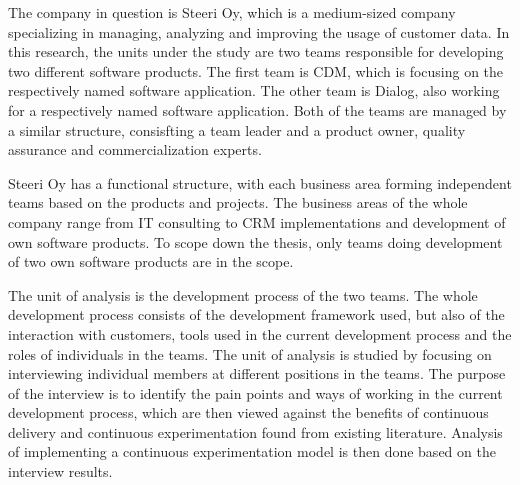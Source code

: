\documentclass[english]{tktltiki2}
\theoremstyle{definition}
\theoremstyle{remark}
\begin{document}

The company in question is Steeri Oy, which is a medium-sized company specializing in managing, analyzing and improving the usage of customer data. In this research, the units under the study are two teams responsible for developing two different software products. The first team is CDM, which is focusing on the respectively named software application. The other team is Dialog, also working for a respectively named software application. Both of the teams are managed by a similar structure, consisfting a team leader and a product owner, quality assurance and commercialization experts. 

Steeri Oy has a functional structure, with each business area forming independent teams based on the products and projects. The business areas of the whole company range from IT consulting to CRM implementations and development of own software products. To scope down the thesis, only teams doing development of two own software products are in the scope.

The unit of analysis is the development process of the two teams. The whole development process consists of the development framework used, but also of the interaction with customers, tools used in the current development process and the roles of individuals in the teams. The unit of analysis is studied by focusing on interviewing individual members at different positions in the teams. The purpose of the interview is to identify the pain points and ways of working in the current development process, which are then viewed against the benefits of continuous delivery and continuous experimentation found from existing literature. Analysis of implementing a continuous experimentation model is then done based on the interview results.  

\end{document}
